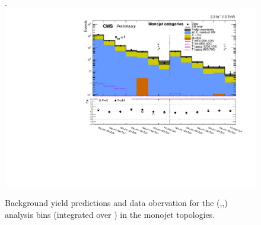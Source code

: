\begin{figure}[tbhp]
\begin{center}
     \\
  \end{center}
\end{figure}


\clearpage

\clearpage

\clearpage


\clearpage

\clearpage

\clearpage





\clearpage
\begin{landscape}
  \begin{center}
    \begin{figure}[h!]
      \caption{Background yield predictions and data obervation for the (\njet,\nb,\scalht) analysis bins (integrated over \MHT) in the monojet topologies. \label{fig:summaryPlot_Monojet}}.
      \includegraphics[width=0.8\linewidth]{figures/postFitResults/summaryPlots/summaryPlot_Monojet_prefit_overlay_fit_b}
    \end{figure}
  \end{center}
\end{landscape}

